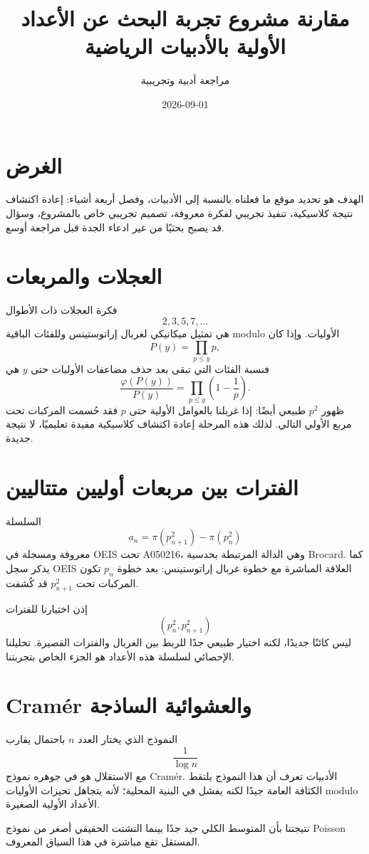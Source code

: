 \documentclass[12pt]{article}
\title{مقارنة مشروع تجربة البحث عن الأعداد الأولية بالأدبيات الرياضية}
\author{مراجعة أدبية وتجريبية}
\date{2026-09-01}
\begin{document}
\maketitle

\section{الغرض}
الهدف هو تحديد موقع ما فعلناه بالنسبة إلى الأدبيات، وفصل أربعة أشياء: إعادة اكتشاف نتيجة كلاسيكية، تنفيذ تجريبي لفكرة معروفة، تصميم تجريبي خاص بالمشروع، وسؤال قد يصبح بحثيًا من غير ادعاء الجدة قبل مراجعة أوسع.

\section{العجلات والمربعات}
فكرة العجلات ذات الأطوال
\[
2,3,5,7,\ldots
\]
هي تمثيل ميكانيكي لغربال إراتوستينس وللفئات الباقية modulo الأوليات. وإذا كان
\[
P(y)=\prod_{p\le y}p,
\]
فنسبة الفئات التي تبقى بعد حذف مضاعفات الأوليات حتى $y$ هي
\[
\frac{\varphi(P(y))}{P(y)}
=
\prod_{p\le y}\left(1-\frac1p\right).
\]
ظهور $p^2$ طبيعي أيضًا: إذا غربلنا بالعوامل الأولية حتى $p$ فقد حُسمت المركبات تحت مربع الأولي التالي. لذلك هذه المرحلة إعادة اكتشاف كلاسيكية مفيدة تعليميًا، لا نتيجة جديدة.

\section{الفترات بين مربعات أوليين متتاليين}
السلسلة
\[
a_n=\pi(p_{n+1}^2)-\pi(p_n^2)
\]
معروفة ومسجلة في OEIS تحت A050216، وهي الدالة المرتبطة بحدسية Brocard. كما يذكر سجل OEIS العلاقة المباشرة مع خطوة غربال إراتوستينس: بعد خطوة $p_n$ تكون المركبات تحت $p_{n+1}^2$ قد كُشفت.

إذن اختيارنا للفترات
\[
(p_n^2,p_{n+1}^2)
\]
ليس كائنًا جديدًا، لكنه اختيار طبيعي جدًا للربط بين الغربال والفترات القصيرة. تحليلنا الإحصائي لسلسلة هذه الأعداد هو الجزء الخاص بتجربتنا.

\section{Cram\'er والعشوائية الساذجة}
النموذج الذي يختار العدد $n$ باحتمال يقارب
\[
\frac1{\log n}
\]
مع الاستقلال هو في جوهره نموذج Cram\'er. الأدبيات تعرف أن هذا النموذج يلتقط الكثافة العامة جيدًا لكنه يفشل في البنية المحلية؛ لأنه يتجاهل تحيزات الأوليات modulo الأعداد الأولية الصغيرة.

نتيجتنا بأن المتوسط الكلي جيد جدًا بينما التشتت الحقيقي أصغر من نموذج Poisson المستقل تقع مباشرة في هذا السياق المعروف.
\end{document}
